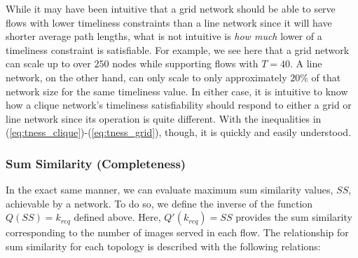 While it may have been intuitive that a grid network should be able to serve flows with lower timeliness constraints than a line network since it will have shorter average path lengths, what is not intuitive is \emph{how much} lower of a timeliness constraint is satisfiable.  For example, we see here that a grid network can scale up to over $250$ nodes while supporting flows with $T = 40$.  A line network, on the other hand, can only scale to only approximately $20\%$ of that network size for the same timeliness value.  In either case, it is intuitive to know how a clique network's timeliness satisfiability should respond to either a grid or line network since its operation is quite different.  With the inequalities in (\ref{eq:tness_clique})-(\ref{eq:tness_grid}), though, it is quickly and easily understood.

%

\subsubsection{Sum Similarity (Completeness)}

In the exact same manner, we can evaluate maximum sum similarity values, $SS$, achievable by a network.  To do so, we define the inverse of the function $Q(SS) = k_{req}$ defined above.  Here, $Q'(k_{req}) = SS$ provides the sum similarity corresponding to the number of images served in each flow.  The relationship for sum similarity for each topology is described with the following relations:


